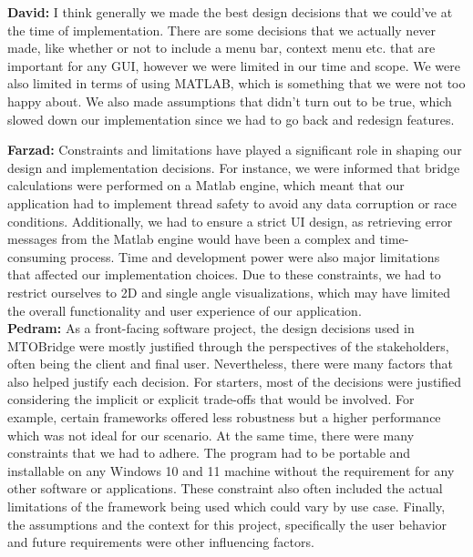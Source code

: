 \documentclass{article}
\begin{document}
\textbf{David:} I think generally we made the best design decisions that we could've at the time of implementation. There are some decisions that we actually never made, like whether or not to include a menu bar, context menu etc. that are important for any GUI, however we were limited in our time and scope. We were also limited in terms of using MATLAB, which is something that we were not too happy about. We also made assumptions that didn't turn out to be true, which slowed down our implementation since we had to go back and redesign features.

\textbf{Farzad:} Constraints and limitations have played a significant role in shaping our design and implementation decisions. For instance, we were informed that bridge calculations were performed on a Matlab engine, which meant that our application had to implement thread safety to avoid any data corruption or race conditions. Additionally, we had to ensure a strict UI design, as retrieving error messages from the Matlab engine would have been a complex and time-consuming process. Time and development power were also major limitations that affected our implementation choices. Due to these constraints, we had to restrict ourselves to 2D and single angle visualizations, which may have limited the overall functionality and user experience of our application.\\

\textbf{Pedram:} As a front-facing software project, the design decisions used in MTOBridge were mostly justified through the perspectives of the stakeholders, often being the 
client and final user. Nevertheless, there were many factors that also helped justify each decision. For starters, most of the decisions were justified considering the implicit 
or explicit trade-offs that would be involved. For example, certain frameworks offered less robustness but a higher performance which was not ideal for our scenario. 
At the same time, there were many constraints that we had to adhere. The program had to be portable and installable on any Windows 10 and 11 machine without the requirement 
for any other software or applications. These constraint also often included the actual limitations of the framework being used which could vary by use case. Finally, 
the assumptions and the context for this project, specifically the user behavior and future requirements were other influencing factors.\\
\end{document}
